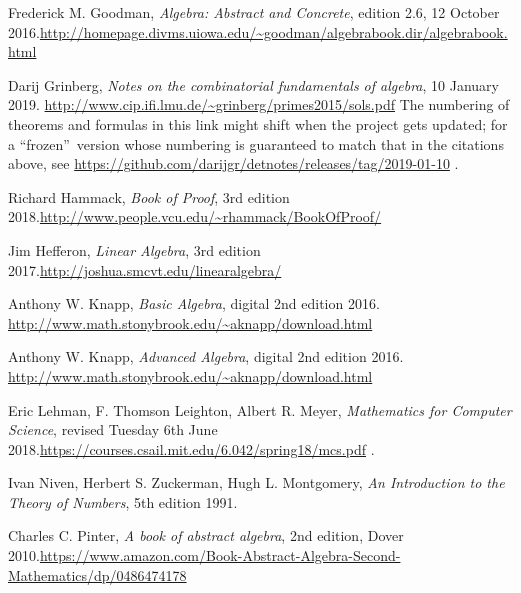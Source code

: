 \documentclass[numbers=enddot,12pt,final,onecolumn,notitlepage]{scrartcl}%
\numberwithin{exer}{section}
\theoremstyle{definition}
\begin{document}
\begin{thebibliography}{99999999}
Frederick M. Goodman, \textit{Algebra: Abstract and
Concrete}, edition 2.6, 12 October 2016.\newline\url{http://homepage.divms.uiowa.edu/~goodman/algebrabook.dir/algebrabook.html}

Darij Grinberg, \textit{Notes on the combinatorial
fundamentals of algebra}, 10 January 2019.\newline%
\url{http://www.cip.ifi.lmu.de/~grinberg/primes2015/sols.pdf} \newline The
numbering of theorems and formulas in this link might shift when the project
gets updated; for a \textquotedblleft frozen\textquotedblright\ version whose
numbering is guaranteed to match that in the citations above, see
\url{https://github.com/darijgr/detnotes/releases/tag/2019-01-10} .

Richard Hammack, \textit{Book of Proof}, 3rd
edition 2018.\newline\url{http://www.people.vcu.edu/~rhammack/BookOfProof/}

Jim Hefferon, \textit{Linear Algebra}, 3rd edition
2017.\newline\url{http://joshua.smcvt.edu/linearalgebra/}

Anthony W. Knapp, \textit{Basic Algebra},
digital 2nd edition 2016.
\newline\url{http://www.math.stonybrook.edu/~aknapp/download.html}

Anthony W. Knapp, \textit{Advanced Algebra},
digital 2nd edition 2016.
\newline\url{http://www.math.stonybrook.edu/~aknapp/download.html}

Eric Lehman, F. Thomson Leighton, Albert R. Meyer,
\textit{Mathematics for Computer Science},  revised Tuesday 6th June
2018.\newline\url{https://courses.csail.mit.edu/6.042/spring18/mcs.pdf} .

Ivan Niven, Herbert S. Zuckerman,
Hugh L. Montgomery, \textit{An Introduction to the Theory of Numbers},
5th edition 1991.

Charles C. Pinter, \textit{A book of abstract
algebra}, 2nd edition, Dover 2010.\newline\url{https://www.amazon.com/Book-Abstract-Algebra-Second-Mathematics/dp/0486474178}


\end{thebibliography}
\end{document}
